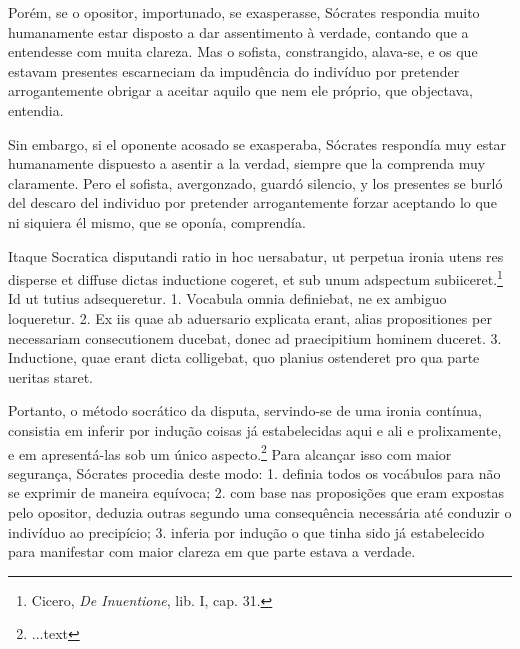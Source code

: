 \documentclass{article}
\begin{document}
\begin{paracol}{3}
  \begin{nthcolumn}{1} %
    Porém, se o opositor, importunado, se exasperasse, Sócrates respondia muito humanamente estar disposto a dar assentimento à verdade, contando que a entendesse com muita clareza. Mas o sofista, constrangido, alava-se, e os que estavam presentes escarneciam da impudência do indivíduo por pretender arrogantemente obrigar a aceitar aquilo que nem ele próprio, que objectava, entendia.
  \end{nthcolumn}
  \vspace{0.5cm}
  \begin{nthcolumn}{2} %
    Sin embargo, si el oponente acosado se exasperaba, Sócrates respondía muy estar humanamente dispuesto a asentir a la verdad, siempre que la comprenda muy claramente. Pero el sofista, avergonzado, guardó silencio, y los presentes se burló del descaro del individuo por pretender arrogantemente forzar aceptando lo que ni siquiera él mismo, que se oponía, comprendía.
  \end{nthcolumn}
  \vspace{0.5cm}
  \begin{nthcolumn*}{0} %
    Itaque Socratica disputandi ratio in hoc uersabatur, ut perpetua ironia utens res disperse et diffuse dictas inductione cogeret, et sub unum adspectum subiiceret.\footnote[19]{Cicero, \emph{De Inuentione}, lib. I, cap. 31.} Id ut tutius adsequeretur. 1. Vocabula omnia definiebat, ne ex ambiguo loqueretur. 2. Ex iis quae ab aduersario explicata erant, alias propositiones per necessariam consecutionem ducebat, donec ad praecipitium hominem duceret. 3. Inductione, quae erant dicta colligebat, quo planius ostenderet pro qua parte ueritas staret.
  \end{nthcolumn*}
  \vspace{0.5cm}
  \begin{nthcolumn}{1} %
    Portanto, o método socrático da disputa, servindo-se de uma ironia contínua, consistia em inferir por indução coisas já estabelecidas aqui e ali e prolixamente, e em apresentá-las sob um único aspecto.\footnote[19]{...text} Para alcançar isso com maior segurança, Sócrates procedia deste modo: 1. definia todos os vocábulos para não se exprimir de maneira equívoca; 2. com base nas proposições que eram expostas pelo opositor, deduzia outras segundo uma consequência necessária até conduzir o indivíduo ao precipício; 3. inferia por indução o que tinha sido já estabelecido para manifestar com maior clareza em que parte estava a verdade.
  \end{nthcolumn}

\end{paracol}
\end{document}
